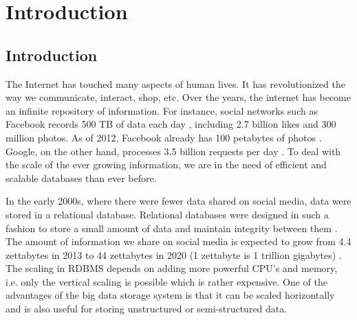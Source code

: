 \documentclass[11pt,a4paper,bibtotoc,idxtotoc,headsepline,footsepline,footexclude,BCOR12mm,DIV13]{scrbook}
\begin{document}
	\frontmatter
	
	
	
	
	
%	
	\clearemptydoublepage
	
	
	
	
	
	
	
	
	
	
	\tableofcontents
  

	\mainmatter
	
	



\chapter{Introduction}
\label{chap:introduction}

\section{Introduction}
\label{Introduction}
The Internet has touched many aspects of human lives. It has revolutionized the way we communicate, interact, shop, etc. Over the years, the internet has become an infinite repository of information. For instance, social networks such as Facebook records 500 TB of data each day \cite{daniel:datastats}, including 2.7 billion likes and 300 million photos. As of 2012, Facebook already has 100 petabytes of photos \cite{daniel:datastats}. Google, on the other hand, processes 3.5 billion requests per day \cite{daniel:datastats}. To deal with the scale of the ever growing information, we are in the need of efficient and scalable databases than ever before. 

In the early 2000s, where there were fewer data shared on social media, data were stored in a relational database. Relational databases were designed in such a fashion to store a small amount of data and maintain integrity between them \cite {matt:rdb}. The amount of information we share on social media is expected to grow from 4.4 zettabytes in 2013 to 44 zettabytes in 2020 (1 zettabyte is 1 trillion gigabytes) \cite{matt:rdb}. The scaling in RDBMS depends on adding more powerful CPU's and memory, i.e. only the vertical scaling is possible which is rather expensive.  One of the advantages of the big data storage system is that it can be scaled horizontally and is also useful for storing unstructured or semi-structured data. 
\end{document}
